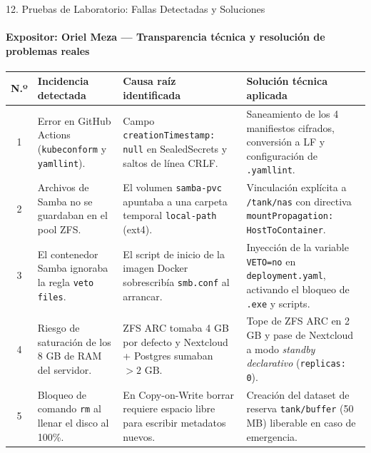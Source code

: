 \documentclass[aspectratio=169,10pt]{beamer}
\begin{document}
\begin{frame}{12. Pruebas de Laboratorio: Fallas Detectadas y Soluciones}
    \framesubtitle{Expositor: Oriel Meza — Transparencia técnica y resolución de problemas reales}
    \footnotesize
    \begin{table}
        \centering
        \begin{tabular}{|c|p{3.6cm}|p{4.4cm}|p{5.2cm}|}
            \hline
            \textbf{N.º} & \textbf{Incidencia detectada} & \textbf{Causa raíz identificada} & \textbf{Solución técnica aplicada} \\
            \hline
            1 & Error en GitHub Actions (\texttt{kubeconform} y \texttt{yamllint}). & Campo \texttt{creationTimestamp: null} en SealedSecrets y saltos de línea CRLF. & Saneamiento de los 4 manifiestos cifrados, conversión a LF y configuración de \texttt{.yamllint}. \\
            \hline
            2 & Archivos de Samba no se guardaban en el pool ZFS. & El volumen \texttt{samba-pvc} apuntaba a una carpeta temporal \texttt{local-path} (ext4). & Vinculación explícita a \texttt{/tank/nas} con directiva \texttt{mountPropagation: HostToContainer}. \\
            \hline
            3 & El contenedor Samba ignoraba la regla \texttt{veto files}. & El script de inicio de la imagen Docker sobrescribía \texttt{smb.conf} al arrancar. & Inyección de la variable \texttt{VETO=no} en \texttt{deployment.yaml}, activando el bloqueo de \texttt{.exe} y scripts. \\
            \hline
            4 & Riesgo de saturación de los 8 GB de RAM del servidor. & ZFS ARC tomaba 4 GB por defecto y Nextcloud + Postgres sumaban $>2\text{ GB}$. & Tope de ZFS ARC en 2 GB y pase de Nextcloud a modo \textit{standby declarativo} (\texttt{replicas: 0}). \\
            \hline
            5 & Bloqueo de comando \texttt{rm} al llenar el disco al 100\%. & En Copy-on-Write borrar requiere espacio libre para escribir metadatos nuevos. & Creación del dataset de reserva \texttt{tank/buffer} (50 MB) liberable en caso de emergencia. \\
            \hline
        \end{tabular}
    \end{table}
\end{frame}
\end{document}
